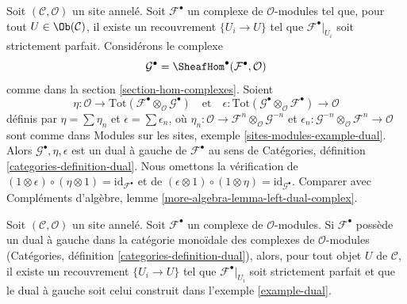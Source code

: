 \begin{example}
\label{example-dual}
Soit $(\mathcal{C}, \mathcal{O})$ un site annelé. Soit
$\mathcal{F}^\bullet$ un complexe de $\mathcal{O}$-modules tel que, pour tout
$U \in \Ob(\mathcal{C})$, il existe un recouvrement $\{U_i \to U\}$ tel que
$\mathcal{F}^\bullet|_{U_i}$ soit strictement parfait. Considérons le complexe
$$
\mathcal{G}^\bullet = \SheafHom^\bullet(\mathcal{F}^\bullet, \mathcal{O})
$$
comme dans la section \ref{section-hom-complexes}. Soient
$$
\eta :
\mathcal{O}
\to
\text{Tot}(\mathcal{F}^\bullet \otimes_\mathcal{O} \mathcal{G}^\bullet)
\quad\text{et}\quad
\epsilon :
\text{Tot}(\mathcal{G}^\bullet \otimes_\mathcal{O} \mathcal{F}^\bullet)
\to
\mathcal{O}
$$
définis par $\eta = \sum \eta_n$ et $\epsilon = \sum \epsilon_n$, où
$\eta_n : \mathcal{O} \to
\mathcal{F}^n \otimes_\mathcal{O} \mathcal{G}^{-n}$
et
$\epsilon_n : \mathcal{G}^{-n} \otimes_\mathcal{O} \mathcal{F}^n
\to \mathcal{O}$ sont comme dans Modules sur les sites, exemple
\ref{sites-modules-example-dual}. Alors
$\mathcal{G}^\bullet, \eta, \epsilon$ est un dual à gauche de
$\mathcal{F}^\bullet$ au sens de Catégories, définition
\ref{categories-definition-dual}. Nous omettons la vérification de
$(1 \otimes \epsilon) \circ (\eta \otimes 1) = \text{id}_{\mathcal{F}^\bullet}$
et de
$(\epsilon \otimes 1) \circ (1 \otimes \eta) =
\text{id}_{\mathcal{G}^\bullet}$. Comparer avec Compléments d'algèbre, lemme
\ref{more-algebra-lemma-left-dual-complex}.
\end{example}

\begin{lemma}
\label{lemma-left-dual-complex}
Soit $(\mathcal{C}, \mathcal{O})$ un site annelé. Soit
$\mathcal{F}^\bullet$ un complexe de $\mathcal{O}$-modules. Si
$\mathcal{F}^\bullet$ possède un dual à gauche dans la catégorie monoïdale
des complexes de $\mathcal{O}$-modules (Catégories, définition
\ref{categories-definition-dual}), alors, pour tout objet $U$ de
$\mathcal{C}$, il existe un recouvrement $\{U_i \to U\}$ tel que
$\mathcal{F}^\bullet|_{U_i}$ soit strictement parfait et que le dual à gauche
soit celui construit dans l'exemple \ref{example-dual}.
\end{lemma}


